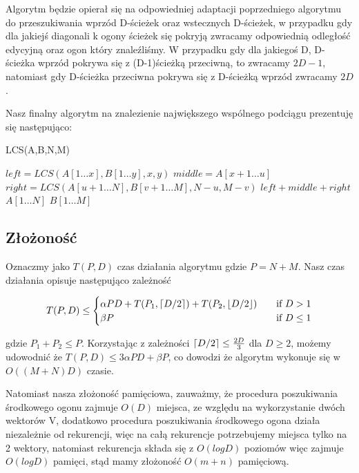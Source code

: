 \documentclass[12pt]{article}
\DeclarePairedDelimiter\ceil{\lceil}{\rceil}
\DeclarePairedDelimiter\floor{\lfloor}{\rfloor}
\begin{document}
\vspace{5mm}

Algorytm będzie opierał się na odpowiedniej adaptacji poprzedniego algorytmu do przeszukiwania wprzód D-ścieżek oraz wstecznych D-ścieżek, w przypadku gdy dla jakiejś diagonali k ogony ścieżek się pokryją zwracamy odpowiednią odległość edycyjną oraz ogon który znaleźliśmy. W przypadku gdy dla jakiegoś D, D-ścieżka wprzód pokrywa się z (D-1)ścieżką przeciwną, to zwracamy $2D - 1$, natomiast gdy D-ścieżka przeciwna pokrywa się z D-ścieżką wprzód zwracamy $2D$.

\vspace{2mm}

Nasz finalny algorytm na znalezienie największego wspólnego podciągu prezentuję się następująco:

\begin{algorithm}
\caption{LCS(A,B,N,M)}
\begin{algorithmic}
        \STATE $left = LCS(A[1\dots x],B[1\dots y],x,y)$
        \STATE $middle = A[x+1\dots u]$
        \STATE $right = LCS(A[u+1\dots N],B[v+1\dots M],N-u,M-v)$
        \RETURN $left + middle + right$
        \RETURN $A[1\dots N]$
    \ELSE
        \RETURN $B[1\dots M]$
    \ENDIF
\ENDIF
\end{algorithmic}
\end{algorithm}

\subsection{Złożoność}

Oznaczmy jako $T(P,D)$ czas działania algorytmu gdzie $P = N + M$. Nasz czas działania opisuje następująco zależność

\[   
T(P,D) \leq 
     \begin{cases}
       \alpha PD + T(P_{1},\ceil*{D/2}) + T(P_{2}, \floor{D/2}) &\quad\text{if } D > 1 \\
       \beta P &\quad\text{if } D \leq 1 \\
     \end{cases}
\]


gdzie $P_{1} + P_{2} \leq P$. Korzystając z zależności $\ceil*{D/2} \leq \frac{2D}{3}$ dla $D \geq 2$, możemy udowodnić że $T(P,D) \leq 3\alpha PD + \beta P$, co dowodzi że algorytm wykonuje się w $O((M+N)D)$ czasie.
\vspace{4mm}    

Natomiast nasza złożoność pamięciowa, zauważmy, że procedura poszukiwania środkowego ogonu zajmuje $O(D)$ miejsca, ze względu na wykorzystanie dwóch wektorów V, dodatkowo procedura poszukiwania środkowego ogona działa niezależnie od rekurencji, więc na całą rekurencje potrzebujemy miejsca tylko na 2 wektory, natomiast rekurencja składa się z $O(logD)$ poziomów więc zajmuje $O(logD)$ pamięci, stąd mamy złożoność $O(m+n)$ pamięciową.
\end{document}
